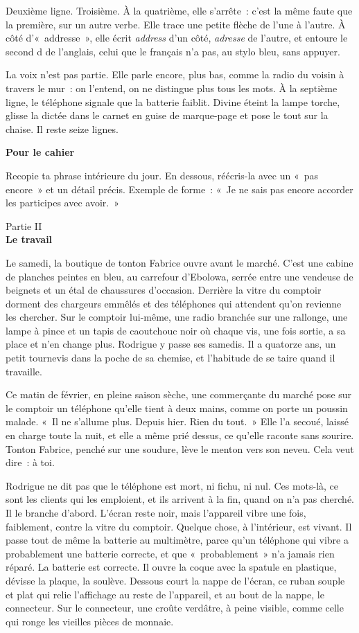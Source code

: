 \documentclass[10.5pt,twoside,openright]{book}
\newenvironment{pourcahier}[1]{\par\vspace{0.9em}\begin{tcolorbox}[colback=black!4,colframe=accent,boxrule=0pt,leftrule=2.2pt,arc=0pt,left=8pt,right=8pt,top=5pt,bottom=5pt]\small\textbf{#1}\par\smallskip}{\end{tcolorbox}\par}
\newcommand{\partie}[2]{\cleardoublepage\thispagestyle{empty}\vspace*{\fill}\begin{center}{\large\color{gris}Partie #2}\\[1.2em]{\Huge\bfseries #1}\end{center}\vspace*{\fill}\cleardoublepage\markboth{}{}}
\newcommand{\chapitre}[2]{\cleardoublepage\markright{#2}\thispagestyle{plain}\vspace*{2.2cm}{\noindent\color{accent}\fontsize{54}{54}\selectfont\bfseries #1}\par\vspace{0.5em}{\noindent\LARGE\bfseries #2\par}\vspace{1.6em}\noindent\ignorespaces}
\begin{document}
Deuxième ligne. Troisième. À la quatrième, elle s’arrête : c’est la même faute que la première, sur un autre verbe. Elle trace une petite flèche de l’une à l’autre. À côté d’« addresse », elle écrit \emph{address} d’un côté, \emph{adresse} de l’autre, et entoure le second d de l’anglais, celui que le français n’a pas, au stylo bleu, sans appuyer.

La voix n’est pas partie. Elle parle encore, plus bas, comme la radio du voisin à travers le mur : on l’entend, on ne distingue plus tous les mots. À la septième ligne, le téléphone signale que la batterie faiblit. Divine éteint la lampe torche, glisse la dictée dans le carnet en guise de marque-page et pose le tout sur la chaise. Il reste seize lignes.

\begin{pourcahier}{Pour le cahier}
Recopie ta phrase intérieure du jour. En dessous, réécris-la avec un « pas encore » et un détail précis. Exemple de forme : « Je ne sais pas encore accorder les participes avec avoir. »
\end{pourcahier}


\partie{Le travail}{II}

\chapitre{6}{Redescendre}

Le samedi, la boutique de tonton Fabrice ouvre avant le marché. C’est une cabine de planches peintes en bleu, au carrefour d’Ebolowa, serrée entre une vendeuse de beignets et un étal de chaussures d’occasion. Derrière la vitre du comptoir dorment des chargeurs emmêlés et des téléphones qui attendent qu’on revienne les chercher. Sur le comptoir lui-même, une radio branchée sur une rallonge, une lampe à pince et un tapis de caoutchouc noir où chaque vis, une fois sortie, a sa place et n’en change plus. Rodrigue y passe ses samedis. Il a quatorze ans, un petit tournevis dans la poche de sa chemise, et l’habitude de se taire quand il travaille.

Ce matin de février, en pleine saison sèche, une commerçante du marché pose sur le comptoir un téléphone qu’elle tient à deux mains, comme on porte un poussin malade. « Il ne s’allume plus. Depuis hier. Rien du tout. » Elle l’a secoué, laissé en charge toute la nuit, et elle a même prié dessus, ce qu’elle raconte sans sourire. Tonton Fabrice, penché sur une soudure, lève le menton vers son neveu. Cela veut dire : à toi.

Rodrigue ne dit pas que le téléphone est mort, ni fichu, ni nul. Ces mots-là, ce sont les clients qui les emploient, et ils arrivent à la fin, quand on n’a pas cherché. Il le branche d’abord. L’écran reste noir, mais l’appareil vibre une fois, faiblement, contre la vitre du comptoir. Quelque chose, à l’intérieur, est vivant. Il passe tout de même la batterie au multimètre, parce qu’un téléphone qui vibre a probablement une batterie correcte, et que « probablement » n’a jamais rien réparé. La batterie est correcte. Il ouvre la coque avec la spatule en plastique, dévisse la plaque, la soulève. Dessous court la nappe de l’écran, ce ruban souple et plat qui relie l’affichage au reste de l’appareil, et au bout de la nappe, le connecteur. Sur le connecteur, une croûte verdâtre, à peine visible, comme celle qui ronge les vieilles pièces de monnaie.
\end{document}
